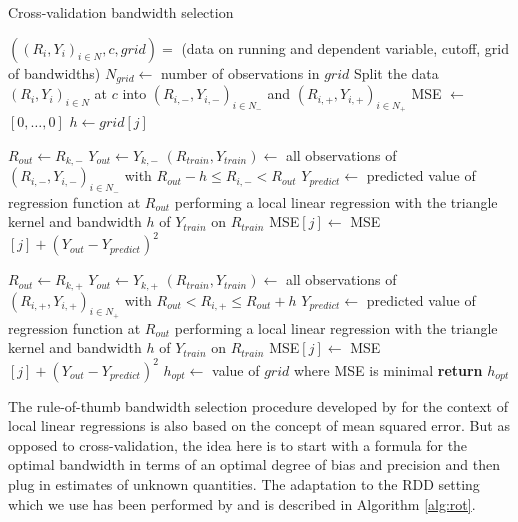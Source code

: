 \documentclass[11pt, a4paper, leqno]{article}
\numberwithin{equation}{section}
\numberwithin{figure}{section}
\numberwithin{table}{section}
\numberwithin{algorithm}{section}
\begin{document}
\begin{algorithm}[H]
	\caption{Cross-validation bandwidth selection}\label{alg:cv}
	\begin{algorithmic}[1]
		\Require $((R_{i}, Y_{i})_{i \in N}, c, grid) =$ (data on running and dependent variable, cutoff, grid of bandwidths)
		\State $N_{grid} \gets$ number of observations in $grid$
		\State Split the data $(R_{i}, Y_{i})_{i \in N}$ at $c$ into $(R_{i, -}, Y_{i, -})_{i \in N_{-}}$ and $(R_{i, +}, Y_{i, +})_{i \in N_{+}}$
		\State MSE $\gets$ $\left[ 0, \dots, 0 \right]$
		\State $h \gets grid[j]$

		\State $R_{out} \gets R_{k, -}$
		\State $Y_{out} \gets Y_{k, -}$
		\State $\left(R_{train}, Y_{train}\right) \gets$ all observations of $(R_{i, -}, Y_{i, -})_{i \in N_{-}}$ with $R_{out}-h \leq R_{i, -} < R_{out}$
		\State $Y_{predict} \gets$ predicted value of regression function at $R_{out}$ performing a local linear \newline
		\mbox{} regression with the triangle kernel and bandwidth $h$ of $Y_{train}$ on $R_{train}$
		\State MSE$[j] \gets$ MSE$[j] + \left( Y_{out} - Y_{predict} \right)^{2}$
		\EndFor

		\State $R_{out} \gets R_{k, +}$
		\State $Y_{out} \gets Y_{k, +}$
		\State $\left(R_{train}, Y_{train}\right) \gets$ all observations of  $(R_{i, +}, Y_{i, +})_{i \in N_{+}}$ with $R_{out} < R_{i, +} \leq R_{out}+h $
		\State $Y_{predict} \gets$ predicted value of regression function at $R_{out}$ performing a local linear \newline
		\mbox{} regression with the triangle kernel and bandwidth $h$ of $Y_{train}$ on $R_{train}$
		\State MSE$[j] \gets$ MSE$[j] + \left( Y_{out} - Y_{predict} \right)^{2}$
		\EndFor
		\EndFor
		\State $h_{opt} \gets$ value of $grid$ where MSE is minimal
		\State \textbf{return} $h_{opt}$
	\end{algorithmic}
\end{algorithm}

The rule-of-thumb bandwidth selection procedure developed by \cite{fan_gij} for the context of local linear regressions is also based on the concept of mean squared error. But as opposed to cross-validation, the idea here is to start with a formula for the optimal bandwidth in terms of an optimal degree of bias and precision and then plug in estimates of unknown quantities. The adaptation to the RDD setting which we use has been performed by \cite{imbens_kalyanaraman} and is described in Algorithm \ref{alg:rot}.
\end{document}
